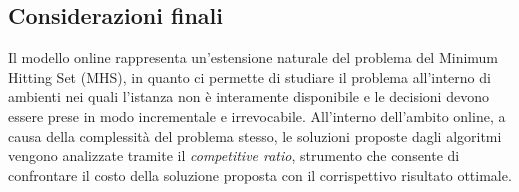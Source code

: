 \subsection*{Considerazioni finali}

Il modello online rappresenta un'estensione naturale del problema del Minimum Hitting Set (MHS), in quanto ci permette di studiare il problema all'interno di ambienti nei quali l'istanza non è interamente disponibile e le decisioni devono essere prese in modo incrementale e irrevocabile.
All'interno dell'ambito online, a causa della complessità del problema stesso, le soluzioni proposte dagli algoritmi vengono analizzate tramite il \emph{competitive ratio}, strumento che consente di confrontare il costo della soluzione proposta con il corrispettivo risultato ottimale.